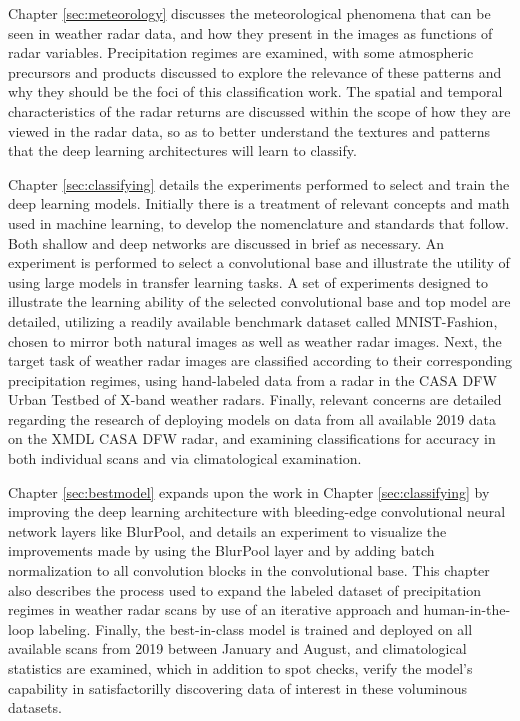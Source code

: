 Chapter \ref{sec:meteorology} discusses the meteorological phenomena that can be seen in weather radar data, and how they present in the images as functions of radar variables.
Precipitation regimes are examined, with some atmospheric precursors and products discussed to explore the relevance of these patterns and why they should be the foci of this classification work.
The spatial and temporal characteristics of the radar returns are discussed within the scope of how they are viewed in the radar data, so as to better understand the textures and patterns that the deep learning architectures will learn to classify.

Chapter \ref{sec:classifying} details the experiments performed to select and train the deep learning models.
Initially there is a treatment of relevant concepts and math used in machine learning, to develop the nomenclature and standards that follow.
Both shallow and deep networks are discussed in brief as necessary.
An experiment is performed to select a convolutional base and illustrate the utility of using large models in transfer learning tasks.
A set of experiments designed to illustrate the learning ability of the selected convolutional base and top model are detailed, utilizing a readily available benchmark dataset called MNIST-Fashion, chosen to mirror both natural images as well as weather radar images.
Next, the target task of weather radar images are classified according to their corresponding precipitation regimes, using hand-labeled data from a radar in the CASA DFW Urban Testbed of X-band weather radars.
Finally, relevant concerns are detailed regarding the research of deploying models on data from all available 2019 data on the XMDL CASA DFW radar, and examining classifications for accuracy in both individual scans and via climatological examination.

Chapter \ref{sec:bestmodel} expands upon the work in Chapter \ref{sec:classifying} by improving the deep learning architecture with bleeding-edge convolutional neural network layers like BlurPool, and details an experiment to visualize the improvements made by using the BlurPool layer and by adding batch normalization to all convolution blocks in the convolutional base. 
This chapter also describes the process used to expand the labeled dataset of precipitation regimes in weather radar scans by use of an iterative approach and human-in-the-loop labeling.
Finally, the best-in-class model is trained and deployed on all available scans from 2019 between January and August, and climatological statistics are examined, which in addition to spot checks, verify the model's capability in satisfactorilly discovering data of interest in these voluminous datasets.

